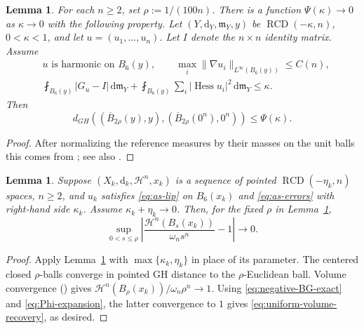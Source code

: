 \documentclass[12pt,a4paper,reqno]{amsart}
\newtheorem{lemma}[theorem]{Lemma}
\renewcommand{\leq}{\leqslant}
\renewcommand{\geq}{\geqslant}
\newcommand{\m}{\mathfrak m}
\newcommand{\Hn}{\mathcal H^n}
\newcommand{\Hess}{\operatorname{Hess}}
\begin{document}
\begin{lemma}\label{lem:almost-splitting}
For each $n\geq2$, set $\rho:=1/(100n)$.  There is a function
$\Psi(\kappa)\to 0$ as $\kappa\to 0$ with the following
property.  Let $(Y,\mathrm{d}_Y,\m_Y,y)$ be $\operatorname{RCD}(-\kappa,n)$,
$0<\kappa<1$, and let $u=(u_1,\ldots,u_n)$. Let $I$ denote the $n\times n$ identity matrix.  Assume
\begin{align}
 &u\text{ is harmonic on }B_6(y),\qquad
 \max_i\|\nabla u_i\|_{L^\infty(B_{6}(y))}\leq C(n),\label{eq:as-lip}\\
 &\fint_{B_{6}(y)}|G_u-I|\,\mathrm{d}\m_Y
 +\fint_{B_{6}(y)}\sum_i|\Hess u_i|^2\,\mathrm{d}\m_Y\leq \kappa.
 \label{eq:as-errors}
\end{align}
Then
\begin{equation}\label{eq:as-gh}
 d_{GH}\left((\overline B_{2\rho}(y),y),
 (\overline B_{2\rho}(0^n),0^n)\right)\leq\Psi(\kappa).
\end{equation}
\end{lemma}

\begin{proof}
After normalizing
the reference measures by their masses on the unit balls this comes from
\cite[Theorem 3.8(ii)]{BNSInv}; see also 
\cite[Proposition 1.5]{BruePasqualettoSemola}.  
\end{proof}

\begin{lemma}\label{lem:volume-recovery}
Suppose $(X_k,\mathrm{d}_k,\Hn,x_k)$ is a sequence of pointed
$\operatorname{RCD}(-\eta_k,n)$ spaces, $n\geq2$, and $u_k$ satisfies
\eqref{eq:as-lip} on $B_6(x_k)$ and \eqref{eq:as-errors} with right-hand
side $\kappa_k$.
Assume $\kappa_k+\eta_k\to0$.  Then, for the fixed
$\rho$ in Lemma~\ref{lem:almost-splitting},
\begin{equation}\label{eq:uniform-volume-recovery}
 \sup_{0<s\leq\rho}
 \left|\frac{\Hn(B_s(x_k))}{\omega_ns^n}-1\right|\to 0.
\end{equation}
\end{lemma}

\begin{proof}
Apply Lemma~\ref{lem:almost-splitting} with
$\max\{\kappa_k,\eta_k\}$ in place of its parameter.  The centered closed
$\rho$-balls converge in pointed GH distance to the $\rho$-Euclidean ball. Volume convergence (\cite[Theorem 1.3]{DePhilippisGigli}) gives $
 \Hn(B_{\rho}(x_k))/\omega_n\rho^n\to 1$.
Using \eqref{eq:negative-BG-exact} and \eqref{eq:Phi-expansion}, the latter convergence to $1$ gives
\eqref{eq:uniform-volume-recovery}, as desired.
\end{proof}
\end{document}
